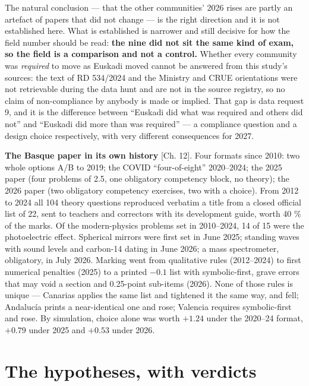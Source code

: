 \documentclass[
  10.5pt,
  a4paper,
  DIV=11,
  numbers=noendperiod]{scrartcl}
\begin{document}
The natural conclusion --- that the other communities' 2026 rises are
partly an artefact of papers that did not change --- is the right
direction and it is not established here. What is established is
narrower and still decisive for how the field number should be read:
\textbf{the nine did not sit the same kind of exam, so the field is a
comparison and not a control.} Whether every community was
\emph{required} to move as Euskadi moved cannot be answered from this
study's sources: the text of RD 534/2024 and the Ministry and CRUE
orientations were not retrievable during the data hunt and are not in
the source registry, so no claim of non-compliance by anybody is made or
implied. That gap is data request 9, and it is the difference between
``Euskadi did what was required and others did not'' and ``Euskadi did
more than was required'' --- a compliance question and a design choice
respectively, with very different consequences for 2027.

\textbf{The Basque paper in its own history} {[}Ch. 12{]}. Four formats
since 2010: two whole options A/B to 2019; the COVID ``four-of-eight''
2020--2024; the 2025 paper (four problems of 2.5, one obligatory
competency block, no theory); the 2026 paper (two obligatory competency
exercises, two with a choice). From 2012 to 2024 all 104 theory
questions reproduced verbatim a title from a closed official list of 22,
sent to teachers and correctors with its development guide, worth 40 \%
of the marks. Of the modern-physics problems set in 2010--2024, 14 of 15
were the photoelectric effect. Spherical mirrors were first set in June
2025; standing waves with sound levels and carbon-14 dating in June
2026; a mass spectrometer, obligatory, in July 2026. Marking went from
qualitative rules (2012--2024) to first numerical penalties (2025) to a
printed \(-0.1\) list with symbolic-first, grave errors that may void a
section and 0.25-point sub-items (2026). None of those rules is unique
--- Canarias applies the same list and tightened it the same way, and
fell; Andalucía prints a near-identical one and rose; Valencia requires
symbolic-first and rose. By simulation, choice alone was worth \(+1.24\)
under the 2020--24 format, \(+0.79\) under 2025 and \(+0.53\) under
2026.

\section{The hypotheses, with
verdicts}\label{the-hypotheses-with-verdicts}
\end{document}
